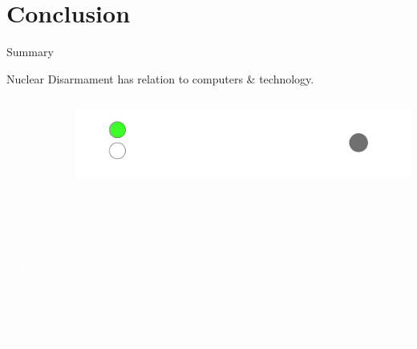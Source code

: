 \documentclass[presentation]{beamer}
\begin{document}
\section{Conclusion}
\label{sec-6}

\begin{frame}[label=sec-6-1]{Summary}
\begin{center}
Nuclear Disarmament has relation to computers \& technology.
\end{center}
\pause

\begin{columns}[t]

\begin{column}{0.35\textwidth}

\begin{tcolorbox}[blackheight]
\tiny
\ttfamily
\textcolor{white}{while(totalnukes > 0) \{}

\hspace{0.3cm} \textcolor{white}{for(i=1; i<=9; i++) \{}

\hspace{0.6cm} \textcolor{white}{weaponstate[i]->disarm();}

\hspace{0.3cm} \textcolor{white}{\}}

\textcolor{white}{\}}
\end{tcolorbox}

\pause
\end{column}

\begin{column}{0.3\textwidth}
\begin{tcolorbox}[blackheight]
\includegraphics[width=\textwidth]{images/ib/ib_good}
\end{tcolorbox}

\pause
\end{column}


\end{columns}
\end{frame}
\end{document}
